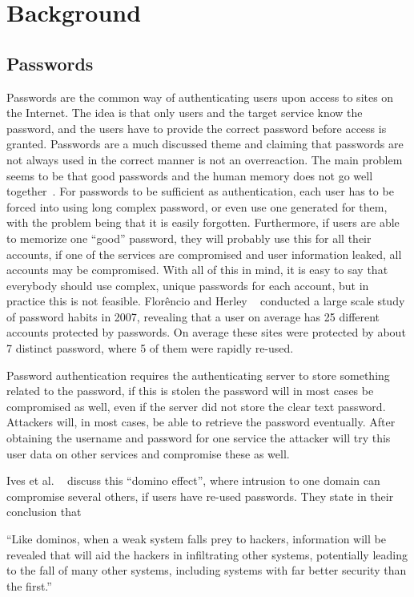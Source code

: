 \chapter{Background}\label{chp:background}


\section{Passwords}
Passwords are the common way of authenticating users upon access to sites on the Internet. The idea is that only users and the target service know the password, and the users have to provide the correct password before access is granted. Passwords are a much discussed theme and claiming that passwords are not always used in the correct manner is not an overreaction. The main problem seems to be that good passwords and the human memory does not go well together~\cite{memorability_yan}. For passwords to be sufficient as authentication, each user has to be forced into using long complex password, or even use one generated for them, with the problem being that it is easily forgotten. Furthermore, if users are able to memorize one ``good'' password, they will probably use this for all their accounts, if one of the services are compromised and user information leaked, all accounts may be compromised. With all of this in mind, it is easy to say that everybody should use complex, unique passwords for each account, but in practice this is not feasible. Florêncio and Herley ~\cite{password-habits} conducted a large scale study of password habits in 2007, revealing that a user on average has 25 different accounts protected by passwords. On average these sites were protected by about 7 distinct password, where 5 of them were rapidly re-used.
\par Password authentication requires the authenticating server to store something related to the password, if this is stolen the password will in most cases be compromised as well, even if the server did not store the clear text password. Attackers will, in most cases, be able to retrieve the password eventually. After obtaining the username and password for one service the attacker will try this user data on other services and compromise these as well. 
\par Ives et al. ~\cite{domino-effect} discuss this ``domino effect'', where intrusion to one domain can compromise several others, if users have re-used passwords. They state in their conclusion that
\begin{displayquote}
``Like dominos, when a weak system falls prey to hackers, information will be revealed that will aid the hackers in infiltrating other systems, potentially leading to the fall of many other systems, including systems with far better security than the first.''
\end{displayquote}

